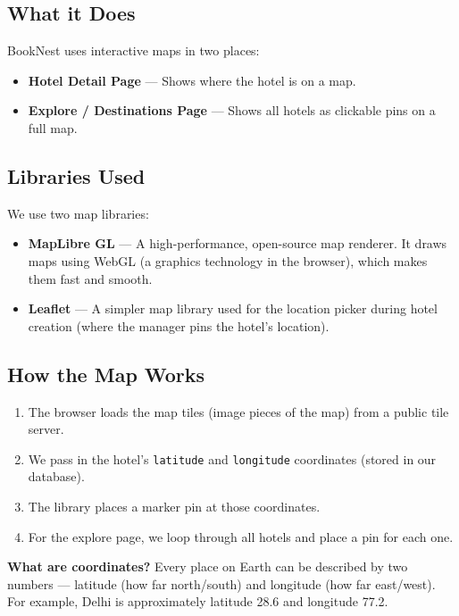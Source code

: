 \documentclass[12pt,a4paper]{article}
\begin{document}
\subsection{What it Does}
BookNest uses interactive maps in two places:
\begin{itemize}
  \item \textbf{Hotel Detail Page} --- Shows where the hotel is on a map.
  \item \textbf{Explore / Destinations Page} --- Shows all hotels as clickable pins on a full map.
\end{itemize}

\subsection{Libraries Used}

We use two map libraries:

\begin{itemize}
  \item \textbf{MapLibre GL} --- A high-performance, open-source map renderer. It draws maps using WebGL (a graphics technology in the browser), which makes them fast and smooth.
  \item \textbf{Leaflet} --- A simpler map library used for the location picker during hotel creation (where the manager pins the hotel's location).
\end{itemize}

\subsection{How the Map Works}

\begin{enumerate}
  \item The browser loads the map tiles (image pieces of the map) from a public tile server.
  \item We pass in the hotel's \texttt{latitude} and \texttt{longitude} coordinates (stored in our database).
  \item The library places a marker pin at those coordinates.
  \item For the explore page, we loop through all hotels and place a pin for each one.
\end{enumerate}

\begin{notebox}
\textbf{What are coordinates?} Every place on Earth can be described by two numbers --- latitude (how far north/south) and longitude (how far east/west). For example, Delhi is approximately latitude 28.6 and longitude 77.2.
\end{notebox}
\end{document}
